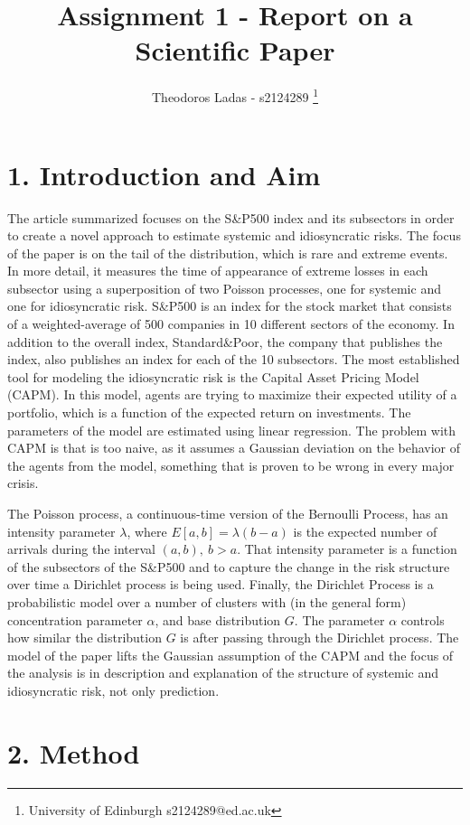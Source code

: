 \documentclass[fleqn, a4paper]{report}
\title{Assignment 1 - Report on a Scientific Paper}
\author{
Theodoros Ladas - s2124289 
\footnote{University of Edinburgh s2124289@ed.ac.uk}
}
\date{\parbox{\linewidth}{\centering%
  January 10, 2021\endgraf\bigskip
  Coordinator: Miguel de Carvalho\endgraf\medskip
  Dept.\ of Mathematics \endgraf
  University of Edinburgh}}
\begin{document}
\maketitle

\section*{1. Introduction and Aim}
The article summarized  \cite{rodriguez2017assessing} focuses on the S\&P500 index and its subsectors in order to create a novel approach to estimate systemic and idiosyncratic risks. The focus of the paper is on the tail of the distribution, which is rare and extreme events. In more detail, it measures the time of appearance of extreme losses in each subsector using a superposition of two Poisson processes, one for systemic and one for idiosyncratic risk. S\&P500 is an index for the stock market that consists of a weighted-average of 500 companies in 10 different sectors of the economy. In addition to the overall index, Standard\&Poor, the company that publishes the index, also publishes an index for each of the 10 subsectors. The most established tool for modeling the idiosyncratic risk is the Capital Asset Pricing Model (CAPM). In this model, agents are trying to maximize their expected utility of a portfolio, which is a function of the expected return on investments. The parameters of the model are estimated using linear regression. The problem with CAPM is that is too naive, as it assumes a Gaussian deviation on the behavior of the agents from the model, something that is proven to be wrong in every major crisis.

The Poisson process, a continuous-time version of the Bernoulli Process, has an intensity parameter $\lambda$, where $E[a,b] = \lambda(b-a)$ is the expected number of arrivals during the interval $(a,b), ~b>a$. That intensity parameter is a function of the subsectors of the S\&P500 and to capture the change in the risk structure over time a Dirichlet process is being used. Finally, the Dirichlet Process is a probabilistic model over a number of clusters with (in the general form) concentration parameter $\alpha$, and base distribution $G$. The parameter $\alpha$ controls how similar the distribution $G$ is after passing through the Dirichlet process. The model of the paper lifts the Gaussian assumption of the CAPM and the focus of the analysis is in description and explanation of the structure of systemic and idiosyncratic risk, not only prediction.
\section*{2. Method}
\end{document}
